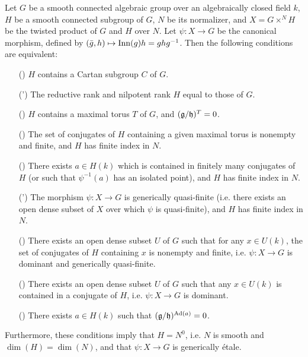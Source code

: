 \begin{theorem}\label{scheme alg group smooth connected subgroup contain Cartan iff}
Let $G$ be a smooth connected algebraic group over an algebraically closed field $k$, $H$ be a smooth connected subgroup of $G$, $N$ be its normalizer, and $X=G\times^NH$ be the twisted product of $G$ and $H$ over $N$. Let $\psi:X\to G$ be the canonical morphism, defined by $(\bar{g},h)\mapsto\mathrm{Inn}(g)h=ghg^{-1}$. Then the following conditions are equivalent:
\begin{enumerate}
    \item[(\rmnum{1})] $H$ contains a Cartan subgroup $C$ of $G$.
    \item[(\rmnum{1}')] The reductive rank and nilpotent rank $H$ equal to those of $G$.
    \item[(\rmnum{2})] $H$ contains a maximal torus $T$ of $G$, and $(\mathfrak{g}/\mathfrak{h})^T=0$.
    \item[(\rmnum{3})] The set of conjugates of $H$ containing a given maximal torus is nonempty and finite, and $H$ has finite index in $N$.
    \item[(\rmnum{4})] There exists $a\in H(k)$ which is contained in finitely many conjugates of $H$ (or such that $\psi^{-1}(a)$ has an isolated point), and $H$ has finite index in $N$.
    \item[(\rmnum{4}')] The morphism $\psi:X\to G$ is generically quasi-finite (i.e. there exists an open dense subset of $X$ over which $\psi$ is quasi-finite), and $H$ has finite index in $N$.
    \item[(\rmnum{5})] There exists an open dense subset $U$ of $G$ such that for any $x\in U(k)$, the set of conjugates of $H$ containing $x$ is nonempty and finite, i.e. $\psi:X\to G$ is dominant and generically quasi-finite.
    \item[(\rmnum{6})] There exists an open dense subset $U$ of $G$ such that any $x\in U(k)$ is contained in a conjugate of $H$, i.e. $\psi:X\to G$ is dominant.
    \item[(\rmnum{7})] There exists $a\in H(k)$ such that $(\mathfrak{g}/\mathfrak{h})^{\mathrm{Ad}(a)}=0$.
\end{enumerate}
Furthermore, these conditions imply that $H=N^0$, i.e. $N$ is smooth and $\dim(H)=\dim(N)$, and that $\psi:X\to G$ is generically \'etale.
\end{theorem}


